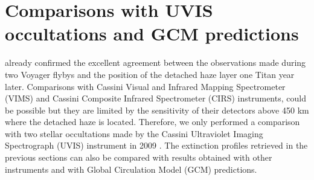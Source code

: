 \section{Comparisons with UVIS occultations and GCM predictions}
\label{seq:comparisons}

\cite{West2018} already confirmed the excellent agreement between the observations made during
two Voyager flybys and the position of the detached haze layer one Titan year later.
Comparisons with Cassini Visual and Infrared Mapping Spectrometer (VIMS) and
Cassini Composite Infrared Spectrometer (CIRS) instruments, could be possible but
they are limited by the sensitivity of their detectors above 450 km where the detached haze is located.
Therefore, we only performed a comparison with two stellar occultations
made by the Cassini Ultraviolet Imaging Spectrograph (UVIS) instrument in 2009 \citep{Koskinen2011}.
The extinction profiles retrieved in the previous sections can also be compared with results
obtained with other instruments and with Global Circulation Model (GCM) predictions.



